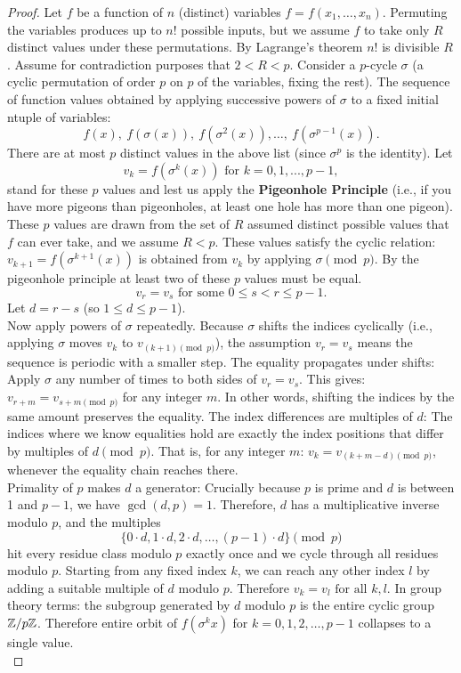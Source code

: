 \begin{proof}
Let $f$ be a function of $n$ (distinct) variables $f=f(x_1,\hdots,x_n)$. 
Permuting the variables produces up to $n!$ possible inputs,  but we assume $f$ to take only $R$ distinct values under these permutations. 
By Lagrange's theorem  $n!$ is divisible $R$. Assume for contradiction purposes that $2 < R < p$. 
Consider a $p$-cycle $\sigma$ (a cyclic permutation of order $p$ on $p$ of the variables, fixing the rest).  
The sequence of function values obtained by applying successive powers of $\sigma$ to a fixed initial ntuple of variables:
\[ f(x), ~f(\sigma(x)), ~f(\sigma^2(x)), \hdots, ~f(\sigma^{p-1}(x)).\]
There are at most $p$ distinct values in the above list (since $\sigma^p$ is the identity).
Let \[ v_k = f(\sigma^k(x))  \mbox{ for } k = 0, 1, ..., p-1,\] stand for these $p$ values  and lest us apply the {\bf Pigeonhole Principle}
(i.e., if you have more pigeons than pigeonholes, at least one hole has more than one pigeon). 
These $p$ values are drawn from the set of $R$ assumed distinct possible values that $f$ can ever take, and we assume $R < p$. 
These values satisfy the cyclic relation: $v_{k+1} = f(\sigma^{k+1}(x))$ is obtained from $v_k$ by applying $\sigma \pmod{p}$.
By the pigeonhole principle at least two of these $p$ values must be equal.
\[ v_r = v_s \mbox{ for some } 0 \le s < r \le p-1. \]
Let $d = r - s$ (so $1 \le d \le p-1$).\\

Now apply powers of $\sigma$ repeatedly. 
Because $\sigma$ shifts the indices cyclically (i.e., applying $\sigma$ moves $v_k$ to $v_{(k+1)\pmod{p}}$),
the assumption $v_r = v_s$ means the sequence is periodic with a smaller step. 
The equality propagates under shifts:
Apply $\sigma$ any number of times to both sides of $v_r = v_s$.
This gives:
$v_{r + m} = v_{s + m \pmod{p}}$ for any integer $m$.
In other words, shifting the indices by the same amount preserves the equality.
The index differences are multiples of $d$:
The indices where we know equalities hold are exactly the index positions that differ by multiples of $d \pmod{p}$.
That is, for any integer $m$:
$v_k = v_{(k + m - d)  \pmod{p}}$, whenever the equality chain reaches there.\\

Primality of $p$ makes $d$ a generator:
Crucially because $p$ is prime and $d$ is between 1 and $p -1$, we have $\gcd(d, p) = 1$.
Therefore, $d$ has a multiplicative inverse modulo $p$, and the multiples
\[ \{ 0\cdot d, 1\cdot d, 2\cdot d,  \hdots,  (p-1)\cdot d \} \pmod{p} \]
hit every residue class modulo $p$ exactly once and we cycle through all residues modulo $p$. 
Starting from any fixed index $k$, we can reach any other index $l$ by adding a suitable multiple of $d$ modulo $p$.
Therefore $v_k = v_l \mbox{ for all } k, l$.
In group theory terms: the subgroup generated by $d$ modulo $p$ is the entire cyclic group $\mathbb{Z}/p\mathbb{Z}$. Therefore entire orbit of $f(\sigma^k x)$ for $k = 0, 1, 2, \hdots, p-1$  collapses to a single value. \\


\end{proof}
